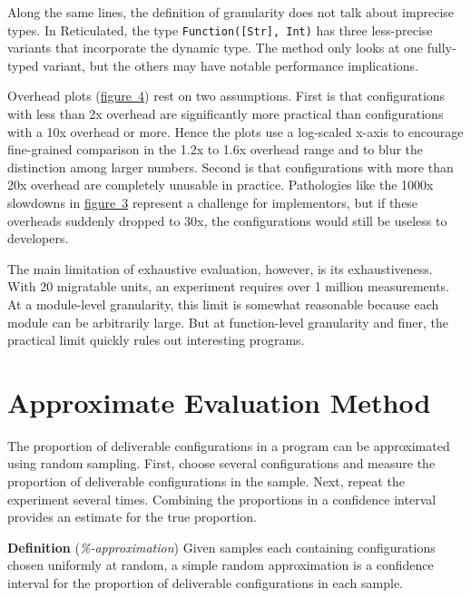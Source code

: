 \documentclass[ twoside,open=right,titlepage,numbers=noenddot,headinclude,%
                footinclude=true,cleardoublepage=empty,abstract=off,
                BCOR=5mm,paper=a4,fontsize=11pt,%
                ngerman,american,%
                parts,pdfspacing]{scrreprt}
\newcommand{\Scribtexttt}[1]{{\texttt{#1}}}
\let\SOriginalthesubsubsection\thesubsubsection
\newcommand{\Ssubsection}[2]{\subsection[#1]{#2}\let\thesubsubsection\SOriginalthesubsubsection}
\newcommand{\FigureRef}[2]{#1}
\renewcommand{\Ssubsection}[2]{\section[#1]{#2}}
\begin{document}
Along the same lines, the definition of granularity does not talk about
 imprecise types.
In Reticulated, the type \Scribtexttt{Function([Str], Int)} has three
 less{-}precise variants that incorporate the dynamic type.
The method only looks at one fully{-}typed variant, but the others may
 have notable performance implications.

Overhead plots (\hyperref[t:x28counter_x28x22figurex22_x22figx3aoverheadx2dplotx2dexamplex22x29x29]{figure~\FigureRef{4}{t:x28counter_x28x22figurex22_x22figx3aoverheadx2dplotx2dexamplex22x29x29}}) rest on two assumptions.
First is that configurations with less than 2x overhead
 are significantly more practical than configurations with a 10x overhead or more.
Hence the plots use a log{-}scaled x{-}axis to encourage
 fine{-}grained comparison in the 1.2x to 1.6x overhead range and to blur the
 distinction among larger numbers.
Second is that configurations with more than 20x
 overhead are completely unusable in practice.
Pathologies like the 1000x slowdowns in \hyperref[t:x28counter_x28x22figurex22_x22figx3aexamplex2dlatticex22x29x29]{figure~\FigureRef{3}{t:x28counter_x28x22figurex22_x22figx3aexamplex2dlatticex22x29x29}}
 represent a challenge for implementors, but if these overheads suddenly
 dropped to 30x, the configurations would still be useless to developers.

The main limitation of exhaustive evaluation, however, is its exhaustiveness.
With 20 migratable units, an experiment requires over 1 million measurements.
At a module{-}level granularity, this limit is somewhat reasonable because each
 module can be arbitrarily large.
But at function{-}level granularity and finer, the practical limit quickly rules
 out interesting programs.

\Ssubsection{Approximate Evaluation Method}{Approximate Evaluation Method}\label{t:x28part_x22Approximatex5fEvaluationx5fMethodx22x29}

The proportion of deliverable configurations in a program can be
 approximated using random sampling.
First, choose several configurations and measure the proportion of
 deliverable configurations in the sample.
Next, repeat the experiment several times.
Combining the proportions in a confidence interval provides an estimate
 for the true proportion.

\relax{\vspace{1ex}
}\textbf{Definition} (\emph{\%{-}approximation}) Given  samples each containing  configurations chosen uniformly at random,
 a simple random approximation is a  confidence interval for
 the proportion of deliverable configurations in each sample.\relax{\vspace{1ex}
}
\end{document}
